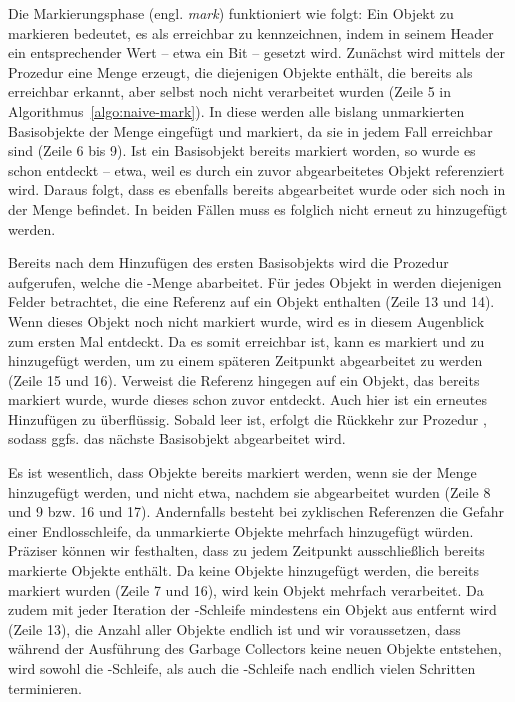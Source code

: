 Die Markierungsphase (engl. \textit{mark}) funktioniert wie folgt:
Ein Objekt zu markieren bedeutet, es als erreichbar zu kennzeichnen, indem in seinem Header ein entsprechender Wert -- etwa ein Bit -- gesetzt wird.
Zunächst wird mittels der Prozedur  eine Menge  erzeugt, die diejenigen Objekte enthält, die bereits als erreichbar erkannt, aber selbst noch nicht verarbeitet wurden (Zeile 5 in Algorithmus~\ref{algo:naive-mark}).
In diese werden alle bislang unmarkierten Basisobjekte der Menge \Roots eingefügt und markiert, da sie in jedem Fall erreichbar sind (Zeile 6 bis 9).
Ist ein Basisobjekt bereits markiert worden, so wurde es schon entdeckt -- etwa, weil es durch ein zuvor abgearbeitetes Objekt referenziert wird.
Daraus folgt, dass es ebenfalls bereits abgearbeitet wurde oder sich noch in der Menge  befindet.
In beiden Fällen muss es folglich nicht erneut zu  hinzugefügt werden.

Bereits nach dem Hinzufügen des ersten Basisobjekts wird die Prozedur  aufgerufen, welche die -Menge abarbeitet.
Für jedes Objekt in  werden diejenigen Felder betrachtet, die eine Referenz auf ein Objekt enthalten (Zeile 13 und 14).
Wenn dieses Objekt noch nicht markiert wurde, wird es in diesem Augenblick zum ersten Mal entdeckt.
Da es somit erreichbar ist, kann es markiert und zu  hinzugefügt werden, um zu einem späteren Zeitpunkt abgearbeitet zu werden (Zeile 15 und 16).
Verweist die Referenz hingegen auf ein Objekt, das bereits markiert wurde, wurde dieses schon zuvor entdeckt.
Auch hier ist ein erneutes Hinzufügen zu  überflüssig.
Sobald  leer ist, erfolgt die Rückkehr zur Prozedur , sodass ggfs. das nächste Basisobjekt abgearbeitet wird.


Es ist wesentlich, dass Objekte bereits markiert werden, wenn sie der Menge  hinzugefügt werden, und nicht etwa, nachdem sie abgearbeitet wurden (Zeile 8 und 9 bzw. 16 und 17).
Andernfalls besteht bei zyklischen Referenzen die Gefahr einer Endlosschleife, da unmarkierte Objekte mehrfach hinzugefügt würden.
Präziser können wir festhalten, dass  zu jedem Zeitpunkt ausschließlich bereits markierte Objekte enthält.
Da keine Objekte hinzugefügt werden, die bereits markiert wurden (Zeile 7 und 16), wird kein Objekt mehrfach verarbeitet.
Da zudem mit jeder Iteration der \WHILE-Schleife mindestens ein Objekt aus  entfernt wird (Zeile 13), die Anzahl aller Objekte endlich ist und wir voraussetzen, dass während der Ausführung des Garbage Collectors keine neuen Objekte entstehen, wird sowohl die \WHILE-Schleife, als auch die \FOREACH-Schleife nach endlich vielen Schritten terminieren.

